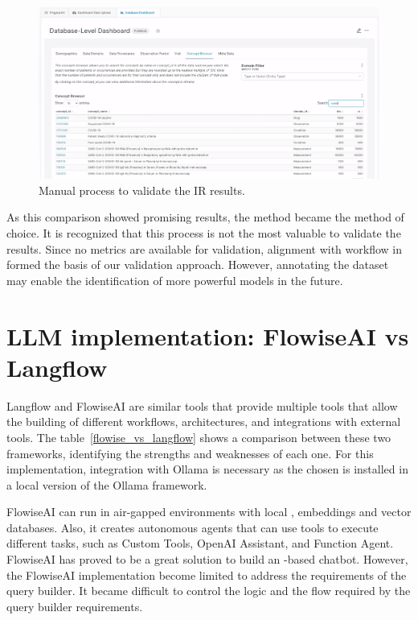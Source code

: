 \begin{figure}[H]
    \includegraphics[width=\textwidth]{figs/chapter5/concept_browser.png}
    \centering
	\caption[Manual process to validate the Information Retrieval results]{Manual process to validate the IR results.}
    \label{fig_ir_sol}
\end{figure}



As this comparison showed promising results, the {\bm} method became the method of choice. It is recognized that this process is not the most valuable to validate the results. Since no metrics are available for validation, alignment with workflow in {\ehden} formed the basis of our validation approach. However, annotating the dataset may enable the identification of more powerful {\ir} models in the future.



\section{LLM implementation: FlowiseAI vs Langflow}

Langflow and FlowiseAI are similar tools that provide multiple tools that allow the building of different workflows, architectures, and integrations with external tools. The table~\ref{flowise_vs_langflow} shows a comparison between these two frameworks, identifying the strengths and weaknesses of each one. For this implementation, integration with Ollama is necessary as the chosen {\llm} is installed in a local version of the Ollama framework. 

FlowiseAI can run in air-gapped environments with local {\llm}, embeddings and vector databases. Also, it creates autonomous agents that can use tools to execute different tasks, such as Custom Tools, OpenAI Assistant, and Function Agent. FlowiseAI has proved to be a great solution to build an {\llm}-based chatbot. However, the FlowiseAI implementation become limited to address the requirements of the query builder. It became difficult to control the logic and the flow required by the query builder requirements. 

